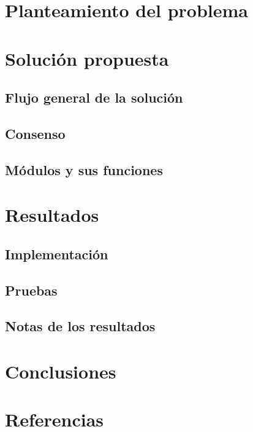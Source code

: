 \documentclass{report}
\begin{document}

    \tableofcontents

    \chapter{\LARGE{Planteamiento del problema}}
    


    \chapter{\LARGE{Solución propuesta}}

    \section{\Large{Flujo general de la solución}}
    

    \section{\Large{Consenso}}
    

    \section{\Large{Módulos y sus funciones}}
    
    
    \chapter{\LARGE{Resultados}}

    \section{\Large{Implementación}}
    

    \section{\Large{Pruebas}}
    

    \section{\Large{Notas de los resultados}}
    

    \chapter{\LARGE{Conclusiones}}
    

    \newpage  
    \chapter*{Referencias}
    \printbibliography
\end{document}
